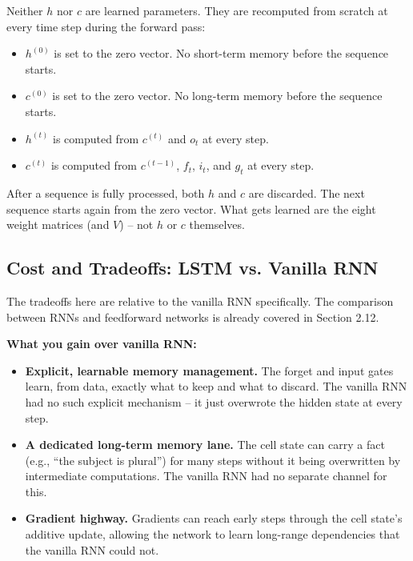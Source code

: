 \documentclass[12pt,a4paper]{article}
\begin{document}
Neither $h$ nor $c$ are learned parameters. They are recomputed from scratch at every
time step during the forward pass:

\begin{itemize}
    \item $h^{(0)}$ is set to the zero vector. No short-term memory before the
    sequence starts.
    \item $c^{(0)}$ is set to the zero vector. No long-term memory before the
    sequence starts.
    \item $h^{(t)}$ is computed from $c^{(t)}$ and $o_t$ at every step.
    \item $c^{(t)}$ is computed from $c^{(t-1)}$, $f_t$, $i_t$, and $g_t$ at every
    step.
\end{itemize}

After a sequence is fully processed, both $h$ and $c$ are discarded. The next
sequence starts again from the zero vector. What gets learned are the eight weight
matrices (and $V$) -- not $h$ or $c$ themselves.

\subsection{Cost and Tradeoffs: LSTM vs. Vanilla RNN}

The tradeoffs here are relative to the vanilla RNN specifically. The comparison
between RNNs and feedforward networks is already covered in Section 2.12.

\textbf{What you gain over vanilla RNN:}

\begin{itemize}
    \item \textbf{Explicit, learnable memory management.} The forget and input gates
    learn, from data, exactly what to keep and what to discard. The vanilla RNN had no
    such explicit mechanism -- it just overwrote the hidden state at every step.
    \item \textbf{A dedicated long-term memory lane.} The cell state can carry a fact
    (e.g., ``the subject is plural'') for many steps without it being overwritten by
    intermediate computations. The vanilla RNN had no separate channel for this.
    \item \textbf{Gradient highway.} Gradients can reach early steps through the cell
    state's additive update, allowing the network to learn long-range dependencies that
    the vanilla RNN could not.
\end{itemize}
\end{document}
